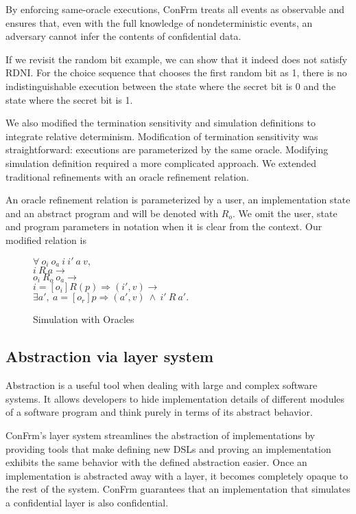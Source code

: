 By enforcing same-oracle executions, ConFrm treats all events as observable and ensures that, even with the full knowledge of nondeterministic events, an adversary cannot infer the contents of confidential data. 

If we revisit the random bit example, we can show that it indeed does not satisfy RDNI. For the choice sequence that chooses the first random bit as 1, there is no indistinguishable execution between the state where the secret bit is 0 and the state where the secret bit is 1.

We also modified the termination sensitivity and simulation definitions to integrate relative determinism. Modification of termination sensitivity was straightforward: executions are parameterized by the same oracle. Modifying simulation definition required a more complicated approach. We extended traditional refinements with an oracle refinement relation.

An oracle refinement relation is parameterized by a user, an implementation state and an abstract program and will be denoted with $R_o$. We omit the user, state and program parameters in notation when it is clear from the context. Our modified relation is

\begin{figure}[H]
$\forall\ o_i\ o_a\ i\ i'\ a\ v,$\\
$i\ R\ a \rightarrow$\\
$o_i\ R_o\ o_a \rightarrow$\\
$i =[o_i] R(p)\Rightarrow (i', v) \rightarrow$\\
$\exists a',\ a =[o_r] p\Rightarrow (a', v)\ \wedge\ i'\ R\ a'.$\\
	\caption{Simulation with Oracles}
\end{figure}

\subsection{Abstraction via layer system}
Abstraction is a useful tool when dealing with large and complex software systems.
It allows developers to hide implementation details of different modules of a software program and think purely in terms of its abstract behavior.

ConFrm's layer system streamlines the abstraction of implementations by providing tools that make defining new DSLs and proving an implementation exhibits the same behavior with the defined abstraction easier. Once an implementation is abstracted away with a layer, it becomes completely opaque to the rest of the system. ConFrm guarantees that an implementation that simulates a confidential layer is also confidential.

